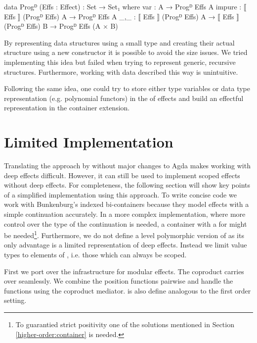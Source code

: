 \begin{code}
data Progᴰ (Effs : Effect) : Set → Set₁ where
  var     : A → Progᴰ Effs A
  impure  : ⟦ Effs ⟧ (Progᴰ Effs) A → Progᴰ Effs A
  _,_     : ⟦ Effs ⟧ (Progᴰ Effs) A → ⟦ Effs ⟧ (Progᴰ Effs) B → Progᴰ Effs (A × B)
\end{code}
By representing data structures using a small type and creating their actual
structure using a new  constructor it is possible to avoid
the size issues.
We tried implementing this idea but failed when trying to represent generic,
recursive structures.
Furthermore, working with data described this way is unintuitive.

Following the same idea, one could try to store either type variables or data
type representation (e.g. polynomial functors) in the  of
effects and build an effectful representation in the container extension.


\section{Limited Implementation}
\label{higher-order:limited-impl}

Translating the approach by \textcite{DBLP:conf/haskell/WuSH14} without major
changes to Agda makes working with deep effects difficult.
However, it can still be used to implement scoped effects without deep effects.
For completeness, the following section will show key points of a simplified
implementation using this approach.
To write concise code we work with Bunkenburg's indexed bi-containers
because they model effects with a simple continuation accurately.
In a more complex implementation, where more control over the type of the
continuation is needed, a container with a  for 
might be needed\footnote{To guarantied strict positivity one of the solutions
  mentioned in Section \ref{higher-order:container} is needed.}.
Furthermore, we do not define a level polymorphic version of 
as its only advantage is a limited representation of deep effects.
Instead we limit value types to elements of , i.e. those which
can always be scoped.

First we port over the infrastructure for modular effects.
The coproduct carries over seamlessly.
We combine the position functions pairwise and handle the 
functions using the coproduct mediator.
 is also define analogous to the first order
setting.

